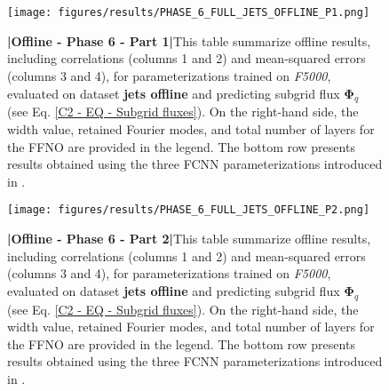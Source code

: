 %
%
\newpage
\thispagestyle{empty}
\part{}
\newpage

\begin{figure}[H]
    \centering
    \texttt{[image: figures/results/PHASE\_6\_FULL\_JETS\_OFFLINE\_P1.png]}
    \caption{\textbf{|}\textcolor{section_color}{\textbf{Offline - Phase 6 - Part 1}}\textbf{|}This table summarize offline results, including correlations (columns 1 and 2) and mean-squared errors (columns 3 and 4), for parameterizations trained on \textit{F5000}, evaluated on dataset \textbf{jets offline} and predicting subgrid flux $\mathbf{\Phi}_q$ (see Eq. \ref{C2 - EQ - Subgrid fluxes}). On the right-hand side, the width value, retained Fourier modes, and total number of layers for the FFNO are provided in the legend. The bottom row presents results obtained using the three FCNN parameterizations introduced in \cite{Benchmarking}.}
    \label{APP - OFFLINE - PHASE 6 - SENSITIVITY ARCHITECTURE P1 - JETS OFFLINE}
\end{figure}

\newpage

\begin{figure}[H]
    \centering
    \texttt{[image: figures/results/PHASE\_6\_FULL\_JETS\_OFFLINE\_P2.png]}
    \caption{\textbf{|}\textcolor{section_color}{\textbf{Offline - Phase 6 - Part 2}}\textbf{|}This table summarize offline results, including correlations (columns 1 and 2) and mean-squared errors (columns 3 and 4), for parameterizations trained on \textit{F5000}, evaluated on dataset \textbf{jets offline} and predicting subgrid flux $\mathbf{\Phi}_q$ (see Eq. \ref{C2 - EQ - Subgrid fluxes}). On the right-hand side, the width value, retained Fourier modes, and total number of layers for the FFNO are provided in the legend. The bottom row presents results obtained using the three FCNN parameterizations introduced in \cite{Benchmarking}.}
    \label{APP - OFFLINE - PHASE 6 - SENSITIVITY ARCHITECTURE P2 - JETS OFFLINE}
\end{figure}

%
%
\newpage

